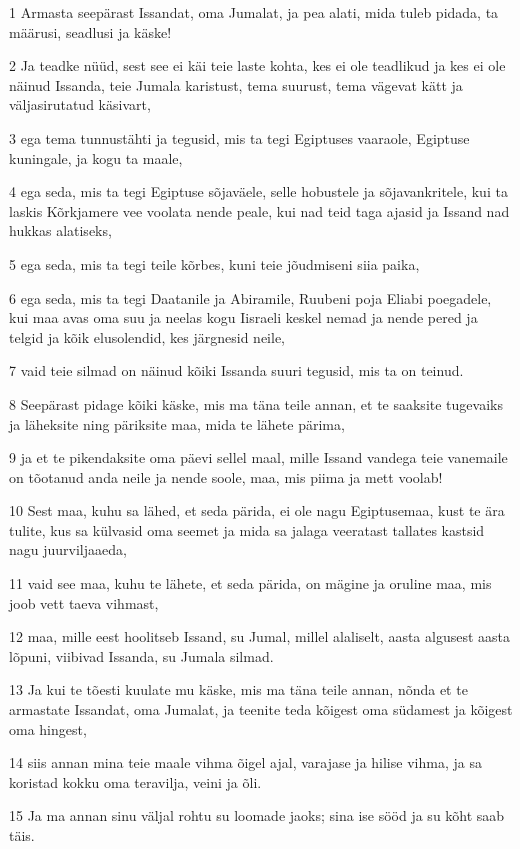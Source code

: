 \par 1 Armasta seepärast Issandat, oma Jumalat, ja pea alati, mida tuleb pidada, ta määrusi, seadlusi ja käske!
\par 2 Ja teadke nüüd, sest see ei käi teie laste kohta, kes ei ole teadlikud ja kes ei ole näinud Issanda, teie Jumala karistust, tema suurust, tema vägevat kätt ja väljasirutatud käsivart,
\par 3 ega tema tunnustähti ja tegusid, mis ta tegi Egiptuses vaaraole, Egiptuse kuningale, ja kogu ta maale,
\par 4 ega seda, mis ta tegi Egiptuse sõjaväele, selle hobustele ja sõjavankritele, kui ta laskis Kõrkjamere vee voolata nende peale, kui nad teid taga ajasid ja Issand nad hukkas alatiseks,
\par 5 ega seda, mis ta tegi teile kõrbes, kuni teie jõudmiseni siia paika,
\par 6 ega seda, mis ta tegi Daatanile ja Abiramile, Ruubeni poja Eliabi poegadele, kui maa avas oma suu ja neelas kogu Iisraeli keskel nemad ja nende pered ja telgid ja kõik elusolendid, kes järgnesid neile,
\par 7 vaid teie silmad on näinud kõiki Issanda suuri tegusid, mis ta on teinud.
\par 8 Seepärast pidage kõiki käske, mis ma täna teile annan, et te saaksite tugevaiks ja läheksite ning päriksite maa, mida te lähete pärima,
\par 9 ja et te pikendaksite oma päevi sellel maal, mille Issand vandega teie vanemaile on tõotanud anda neile ja nende soole, maa, mis piima ja mett voolab!
\par 10 Sest maa, kuhu sa lähed, et seda pärida, ei ole nagu Egiptusemaa, kust te ära tulite, kus sa külvasid oma seemet ja mida sa jalaga veeratast tallates kastsid nagu juurviljaaeda,
\par 11 vaid see maa, kuhu te lähete, et seda pärida, on mägine ja oruline maa, mis joob vett taeva vihmast,
\par 12 maa, mille eest hoolitseb Issand, su Jumal, millel alaliselt, aasta algusest aasta lõpuni, viibivad Issanda, su Jumala silmad.
\par 13 Ja kui te tõesti kuulate mu käske, mis ma täna teile annan, nõnda et te armastate Issandat, oma Jumalat, ja teenite teda kõigest oma südamest ja kõigest oma hingest,
\par 14 siis annan mina teie maale vihma õigel ajal, varajase ja hilise vihma, ja sa koristad kokku oma teravilja, veini ja õli.
\par 15 Ja ma annan sinu väljal rohtu su loomade jaoks; sina ise sööd ja su kõht saab täis.
